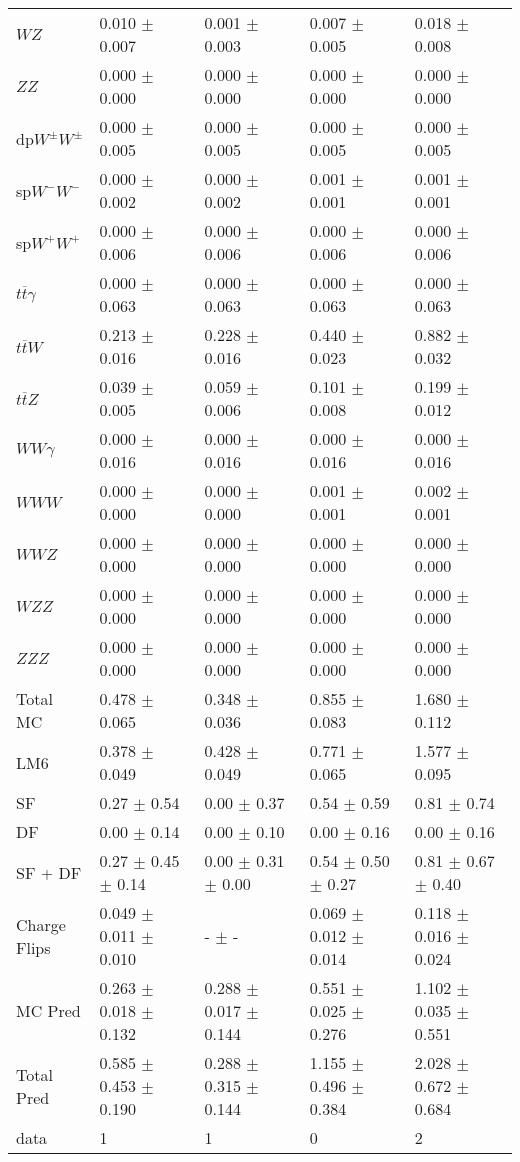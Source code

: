 \begin{tabular}{l | l l l l}
$WZ$ &  0.010 $\pm$  0.007 &  0.001 $\pm$  0.003 &  0.007 $\pm$  0.005 &  0.018 $\pm$  0.008\\
$ZZ$ &  0.000 $\pm$   0.000 &  0.000 $\pm$   0.000 &   0.000 $\pm$   0.000 &   0.000 $\pm$   0.000\\
\hline
dp$W^{\pm}W^{\pm}$ &  0.000 $\pm$  0.005 &  0.000 $\pm$  0.005 &  0.000 $\pm$  0.005 &  0.000 $\pm$  0.005\\
sp$W^{-}W^{-}$ &  0.000 $\pm$  0.002 &  0.000 $\pm$  0.002 &  0.001 $\pm$  0.001 &  0.001 $\pm$  0.001\\
sp$W^{+}W^{+}$ &  0.000 $\pm$  0.006 &  0.000 $\pm$  0.006 &  0.000 $\pm$  0.006 &  0.000 $\pm$  0.006\\
$t\overline{t}\gamma$ &  0.000 $\pm$  0.063 &  0.000 $\pm$  0.063 &  0.000 $\pm$  0.063 &  0.000 $\pm$  0.063\\
$t\overline{t}W$ &  0.213 $\pm$  0.016 &  0.228 $\pm$  0.016 &  0.440 $\pm$  0.023 &  0.882 $\pm$  0.032\\
$t\overline{t}Z$ &  0.039 $\pm$  0.005 &  0.059 $\pm$  0.006 &  0.101 $\pm$  0.008 &  0.199 $\pm$  0.012\\
$WW\gamma$ &  0.000 $\pm$  0.016 &  0.000 $\pm$  0.016 &  0.000 $\pm$  0.016 &  0.000 $\pm$  0.016\\
$WWW$ &   0.000 $\pm$   0.000 &   0.000 $\pm$   0.000 &  0.001 $\pm$  0.001 &  0.002 $\pm$  0.001\\
$WWZ$ &  0.000 $\pm$   0.000 &  0.000 $\pm$   0.000 &  0.000 $\pm$   0.000 &  0.000 $\pm$   0.000\\
$WZZ$ &   0.000 $\pm$   0.000 &  0.000 $\pm$   0.000 &   0.000 $\pm$   0.000 &   0.000 $\pm$   0.000\\
$ZZZ$ &  0.000 $\pm$   0.000 &   0.000 $\pm$   0.000 &   0.000 $\pm$   0.000 &   0.000 $\pm$   0.000\\
\hline
Total MC &  0.478 $\pm$  0.065 &  0.348 $\pm$  0.036 &  0.855 $\pm$  0.083 &  1.680 $\pm$  0.112\\
\hline\hline
\hline
LM6 &  0.378 $\pm$  0.049 &  0.428 $\pm$  0.049 &  0.771 $\pm$  0.065 &  1.577 $\pm$  0.095\\
\hline\hline
\hline\hline
 SF  & 0.27 $\pm$ 0.54 & 0.00 $\pm$ 0.37 & 0.54 $\pm$ 0.59 & 0.81 $\pm$ 0.74\\
 DF  & 0.00 $\pm$ 0.14 & 0.00 $\pm$ 0.10 & 0.00 $\pm$ 0.16 & 0.00 $\pm$ 0.16\\
\hline
 SF + DF  & 0.27 $\pm$ 0.45 $\pm$ 0.14 & 0.00 $\pm$ 0.31 $\pm$ 0.00 & 0.54 $\pm$ 0.50 $\pm$ 0.27 & 0.81 $\pm$ 0.67 $\pm$ 0.40\\
\hline\hline
Charge Flips & 0.049 $\pm$ 0.011 $\pm$ 0.010 & - $\pm$ - & 0.069 $\pm$ 0.012 $\pm$ 0.014 & 0.118 $\pm$ 0.016 $\pm$ 0.024\\
\hline\hline
\hline
MC Pred &  0.263 $\pm$  0.018 $\pm$  0.132 &  0.288 $\pm$  0.017 $\pm$  0.144 &  0.551 $\pm$  0.025 $\pm$  0.276 &  1.102 $\pm$  0.035 $\pm$  0.551\\
\hline\hline
Total Pred &  0.585 $\pm$  0.453 $\pm$  0.190 &  0.288 $\pm$  0.315 $\pm$  0.144 &  1.155 $\pm$  0.496 $\pm$  0.384 &  2.028 $\pm$  0.672 $\pm$  0.684\\
\hline\hline
data & 1 & 1 & 0 & 2\\
\hline\hline
\end{tabular}
